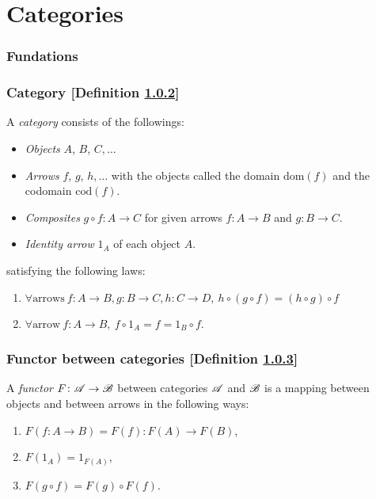 \newcommand{\sets}{\mathbf{Sets}}
\section{Categories}
\setcounter{subsection}{1}
\subsubsection{Fundations}
\subsubsection{Category [Definition \ref{category}]}\label{category}
A \textit{category} consists of the followings:
\begin{itemize}
\item \textit{Objects} $A$, $B$, $C, \dotsc$
\item \textit{Arrows} $f$, $g$, $h, \dotsc$ with the objects called the domain $\mathrm{dom}(f)$ and the codomain $\mathrm{cod}(f)$.
\item \textit{Composites} $g \circ f \colon A \to C$ for given arrows $f \colon A \to B$ and $g \colon B \to C$.
\item \textit{Identity arrow} $1_A$ of each object $A$.
\end{itemize}
satisfying the following laws:
\begin{enumerate}
\item $\forall \text{arrows}\ f \colon A \to B, g \colon B \to C, h \colon C \to D,\ h \circ (g \circ f) = (h \circ g) \circ f$
\item $\forall \text{arrow}\ f \colon A \to B,\ f \circ 1_A = f = 1_B \circ f$.
\end{enumerate}

\subsubsection{Functor between categories [Definition \ref{functor-between-categories}]}\label{functor-between-categories}
A \textit{functor} $F\colon \mathscr{A} \to \mathscr{B}$ between categories $\mathscr{A}$ and $\mathscr{B}$ is a mapping between objects and between arrows in the following ways:
\begin{enumerate}
\item $F(f\colon A \to B) = F(f) \colon F(A) \to F(B)$,
\item $F(1_A) = 1_{F(A)}$,
\item $F(g \circ f) = F(g) \circ F(f)$.    
\end{enumerate}
